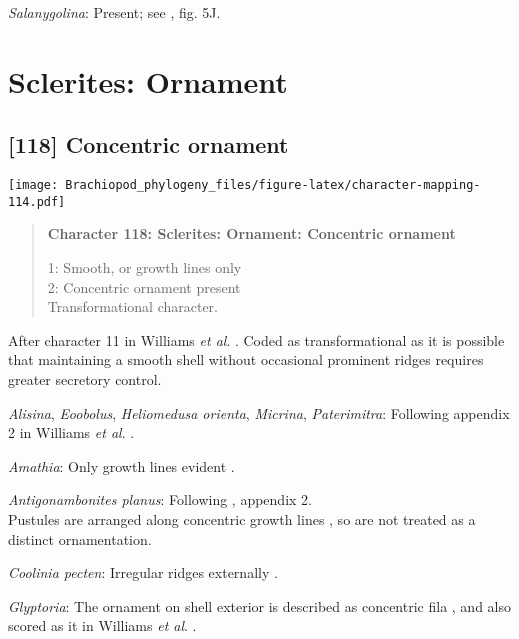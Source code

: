 \documentclass[openany]{book}
\theoremstyle{definition}
\theoremstyle{definition}
\theoremstyle{definition}
\theoremstyle{remark}
\begin{document}
\hypertarget{Salanygolina-coding-117}{}
\emph{Salanygolina}: Present; see \citet{Popov2009Earlyontogeny}, fig.
5J.

\section{Sclerites: Ornament}\label{sclerites-ornament}

\subsection*{{[}118{]} Concentric ornament}\label{concentric-ornament}

\texttt{[image: Brachiopod\_phylogeny\_files/figure-latex/character-mapping-114.pdf]}

\begin{quote}
\textbf{Character 118: Sclerites: Ornament: Concentric ornament}

1: Smooth, or growth lines only\\
2: Concentric ornament present\\
Transformational character.
\end{quote}

After character 11 in Williams \emph{et al}.
\citeyearpar{Williams1998Thediversity}. Coded as transformational as it
is possible that maintaining a smooth shell without occasional prominent
ridges requires greater secretory control.

\hypertarget{Alisina-coding-118}{}
\emph{Alisina}, \emph{Eoobolus}, \emph{Heliomedusa orienta},
\emph{Micrina}, \emph{Paterimitra}: Following appendix 2 in Williams
\emph{et al}. \citeyearpar{Williams1998Thediversity}.

\hypertarget{Amathia-coding-118}{}
\emph{Amathia}: Only growth lines evident
\citep{Williams2000LinguliformeaCraniiformea}.

\hypertarget{Antigonambonites_planus-coding-118}{}
\emph{Antigonambonites planus}: Following
\citet{Williams1998Thediversity}, appendix 2.\\
Pustules are arranged along concentric growth lines
\citep{Skovsted2005EarlyCambrian}, so are not treated as a distinct
ornamentation.

\hypertarget{Coolinia_pecten-coding-118}{}
\emph{Coolinia pecten}: Irregular ridges externally
\citep{Williams2000LinguliformeaCraniiformea}.

\hypertarget{Glyptoria-coding-118}{}
\emph{Glyptoria}: The ornament on shell exterior is described as
concentric fila \citep[P.43]{Chen2007Reinterpretationof}, and also
scored as it in Williams \emph{et al}.
\citeyearpar[pp.160--163]{Williams2000LinguliformeaCraniiformea}.
\end{document}
